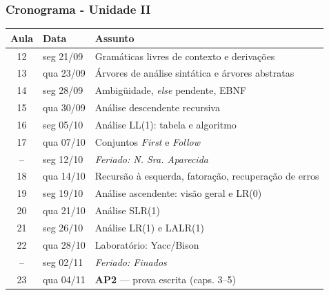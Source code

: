 \documentclass[table]{beamer}
\begin{document}
\begin{frame}
   \frametitle{Cronograma - Unidade II}
   \scriptsize
   \begin{center}
   \begin{tabular}{@{}cl p{6.6cm}@{}}
      \toprule
      \textbf{Aula} & \textbf{Data} & \textbf{Assunto} \\
      \midrule
      12 & seg 21/09 & Gramáticas livres de contexto e derivações \\
      13 & qua 23/09 & Árvores de análise sintática e árvores abstratas \\
      14 & seg 28/09 & Ambigüidade, \textit{else} pendente, EBNF \\
      15 & qua 30/09 & Análise descendente recursiva \\
      16 & seg 05/10 & Análise LL(1): tabela e algoritmo \\
      17 & qua 07/10 & Conjuntos \textit{First} e \textit{Follow} \\
      \midrule
      -- & seg 12/10 & \textit{Feriado: N. Sra. Aparecida} \\
      \midrule
      18 & qua 14/10 & Recursão à esquerda, fatoração, recuperação de erros \\
      19 & seg 19/10 & Análise ascendente: visão geral e LR(0) \\
      20 & qua 21/10 & Análise SLR(1) \\
      21 & seg 26/10 & Análise LR(1) e LALR(1) \\
      22 & qua 28/10 & Laboratório: Yacc/Bison \\
      \midrule
      -- & seg 02/11 & \textit{Feriado: Finados} \\
      \midrule
      23 & qua 04/11 & \textbf{AP2} --- prova escrita (caps. 3--5) \\
      \bottomrule
   \end{tabular}
   \end{center}
\end{frame}
\end{document}
